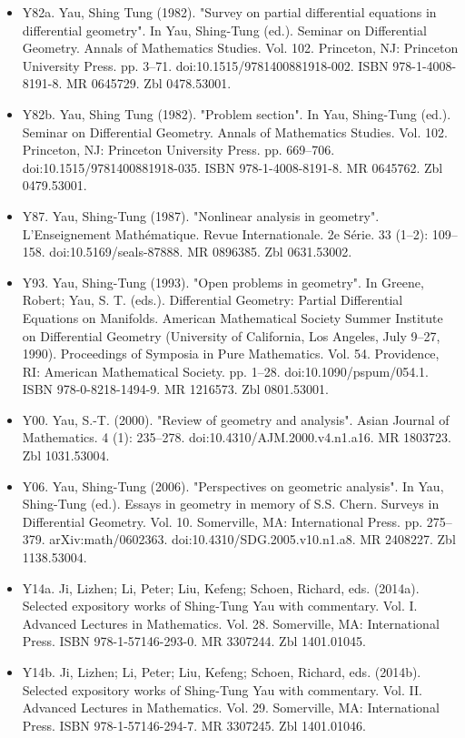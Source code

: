 \begin{itemize}
\item Y82a. Yau, Shing Tung (1982). "Survey on partial differential equations in differential geometry". In Yau, Shing-Tung (ed.). Seminar on Differential Geometry. Annals of Mathematics Studies. Vol. 102. Princeton, NJ: Princeton University Press. pp. 3–71. doi:10.1515/9781400881918-002. ISBN 978-1-4008-8191-8. MR 0645729. Zbl 0478.53001.
\item Y82b. Yau, Shing Tung (1982). "Problem section". In Yau, Shing-Tung (ed.). Seminar on Differential Geometry. Annals of Mathematics Studies. Vol. 102. Princeton, NJ: Princeton University Press. pp. 669–706. doi:10.1515/9781400881918-035. ISBN 978-1-4008-8191-8. MR 0645762. Zbl 0479.53001.
\item Y87. Yau, Shing-Tung (1987). "Nonlinear analysis in geometry". L'Enseignement Mathématique. Revue Internationale. 2e Série. 33 (1–2): 109–158. doi:10.5169/seals-87888. MR 0896385. Zbl 0631.53002.
\item Y93. Yau, Shing-Tung (1993). "Open problems in geometry". In Greene, Robert; Yau, S. T. (eds.). Differential Geometry: Partial Differential Equations on Manifolds. American Mathematical Society Summer Institute on Differential Geometry (University of California, Los Angeles, July 9–27, 1990). Proceedings of Symposia in Pure Mathematics. Vol. 54. Providence, RI: American Mathematical Society. pp. 1–28. doi:10.1090/pspum/054.1. ISBN 978-0-8218-1494-9. MR 1216573. Zbl 0801.53001.
\item Y00. Yau, S.-T. (2000). "Review of geometry and analysis". Asian Journal of Mathematics. 4 (1): 235–278. doi:10.4310/AJM.2000.v4.n1.a16. MR 1803723. Zbl 1031.53004.
\item Y06. Yau, Shing-Tung (2006). "Perspectives on geometric analysis". In Yau, Shing-Tung (ed.). Essays in geometry in memory of S.S. Chern. Surveys in Differential Geometry. Vol. 10. Somerville, MA: International Press. pp. 275–379. arXiv:math/0602363. doi:10.4310/SDG.2005.v10.n1.a8. MR 2408227. Zbl 1138.53004.
\item Y14a. Ji, Lizhen; Li, Peter; Liu, Kefeng; Schoen, Richard, eds. (2014a). Selected expository works of Shing-Tung Yau with commentary. Vol. I. Advanced Lectures in Mathematics. Vol. 28. Somerville, MA: International Press. ISBN 978-1-57146-293-0. MR 3307244. Zbl 1401.01045.
\item Y14b. Ji, Lizhen; Li, Peter; Liu, Kefeng; Schoen, Richard, eds. (2014b). Selected expository works of Shing-Tung Yau with commentary. Vol. II. Advanced Lectures in Mathematics. Vol. 29. Somerville, MA: International Press. ISBN 978-1-57146-294-7. MR 3307245. Zbl 1401.01046.

\end{itemize}
